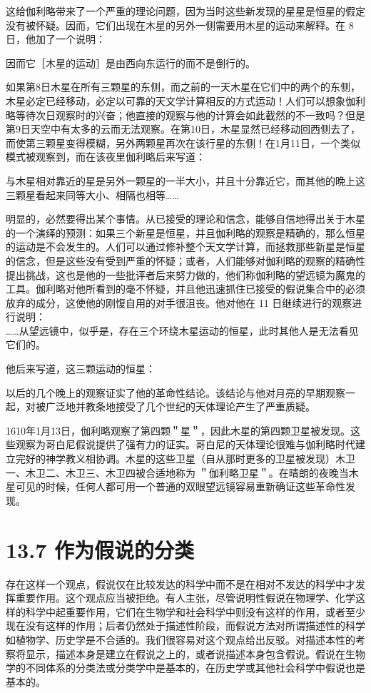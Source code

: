 这给伽利略带来了一个严重的理论问题，因为当时这些新发现的星星是恒星的假定没有被怀疑。因而，它们出现在木星的另外一侧需要用木星的运动来解释。在 8 日，他加了一个说明：

因而它［木星的运动］是由西向东运行的而不是倒行的。

如果第8日木星在所有三颗星的东侧，而之前的一天木星在它们中的两个的东侧，木星必定已经移动，必定以可靠的天文学计算相反的方式运动！人们可以想象伽利略等待次日观察时的兴奋；他直接的观察与他的计算会如此截然的不一致吗？但是第9日天空中有太多的云而无法观察。在第10日，木星显然已经移动回西侧去了，而使第三颗星变得模糊，另外两颗星再次在该行星的东侧！在1月11日，一个类似模式被观察到，而在该夜里伽利略后来写道：

与木星相对靠近的星是另外一颗星的一半大小，并且十分靠近它，而其他的晩上这三颗星看起来同等大小、相隔也相等……

明显的，必然要得出某个事情。从已接受的理论和信念，能够自信地得出关于木星的一个演绎的预测：如果三个新星是恒星，并且伽利略的观察是精确的，那么恒星的运动是不会发生的。人们可以通过修补整个天文学计算，而拯救那些新星是恒星的信念，但是这些没有受到严重的怀疑；或者，人们能够对伽利略的观察的精确性提出挑战，这也是他的一些批评者后来努力做的，他们称伽利略的望远镜为魔鬼的工具。伽利略对他所看到的毫不怀疑，并且他迅速抓住已接受的假说集合中的必须放弃的成分，这使他的刚愎自用的对手很沮丧。他对他在 11 日继续进行的观察进行说明：\\
……从望远镜中，似乎是，存在三个环绕木星运动的恒星，此时其他人是无法看见它们的。

他后来写道，这三颗运动的恒星：

以后的几个晚上的观察证实了他的革命性结论。该结论与他对月亮的早期观察一起，对被广泛地并教条地接受了几个世纪的天体理论产生了严重质疑。

1610年1月13日，伽利略观察了第四颗＂星＂，因此木星的第四颗卫星被发现。这些观察为哥白尼假说提供了强有力的证实。哥白尼的天体理论很难与伽利略时代建立完好的神学教义相协调。木星的这些卫星（自从那时更多的卫星被发现）木卫一、木卫二、木卫三、木卫四被合适地称为 ＂伽利略卫星＂。在晴朗的夜晚当木星可见的时候，任何人都可用一个普通的双眼望远镜容易重新确证这些革命性发现。

\section*{13.7 作为假说的分类}
存在这样一个观点，假说仅在比较发达的科学中而不是在相对不发达的科学中才发挥重要作用。这个观点应当被拒绝。有人主张，尽管说明性假说在物理学、化学这样的科学中起重要作用，它们在生物学和社会科学中则没有这样的作用，或者至少现在没有这样的作用；后者仍然处于描述性阶段，而假说方法对所谓描述性的科学如植物学、历史学是不合适的。我们很容易对这个观点给出反驳。对描述本性的考察将显示，描述本身是建立在假说之上的，或者说描述本身包含假说。假说在生物学的不同体系的分类法或分类学中是基本的，在历史学或其他社会科学中假说也是基本的。

